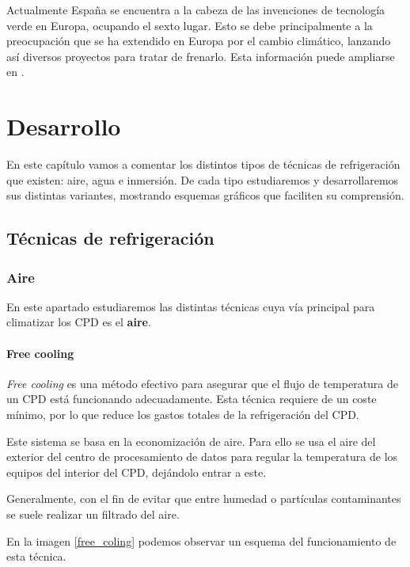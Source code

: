 Actualmente España se encuentra a la cabeza de las invenciones de tecnología verde en Europa, ocupando el sexto lugar. Esto se debe principalmente a la preocupación que se ha extendido en Europa por el cambio climático, lanzando así diversos proyectos para tratar de frenarlo. Esta información puede ampliarse en \cite{efe}.





\chapter{Desarrollo}

En este capítulo vamos a comentar los distintos tipos de técnicas de refrigeración que existen: aire, agua e inmersión. De cada tipo estudiaremos y desarrollaremos sus distintas variantes, mostrando esquemas gráficos que faciliten su comprensión.

\section{Técnicas de refrigeración}



\subsection{Aire} \label{aire}

En este apartado estudiaremos las distintas técnicas cuya vía principal para climatizar los CPD es el \textbf{aire}.


\subsubsection{Free cooling}

\textit{Free cooling} \cite{gento} es una método efectivo para asegurar que el flujo de temperatura de un CPD está funcionando adecuadamente. Esta técnica requiere de un coste mínimo, por lo que reduce los gastos totales de la refrigeración del CPD.

Este sistema se basa en la economización de aire. Para ello se usa el aire del exterior del centro de procesamiento de datos para regular la temperatura de los equipos del interior del CPD, dejándolo entrar a este.

Generalmente, con el fin de evitar que entre humedad o partículas contaminantes se suele realizar un filtrado del aire.

En la imagen \eqref{free_coling} podemos observar un esquema del funcionamiento de esta técnica.

